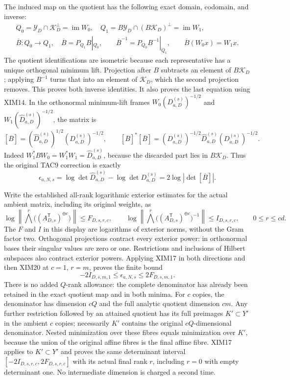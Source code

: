 The induced map on the quotient has the following exact domain,
codomain, and inverse:
\[
\begin{gathered}
 Q_0=\mathscr Y_D\cap\mathscr K_D^\perp=\operatorname{im}W_0,
 \quad Q_1=B\mathscr Y_D\cap(B\mathscr K_D)^\perp
                         =\operatorname{im}W_1,\\
 \overline B:Q_0\longrightarrow Q_1,
       \quad \overline B=P_{Q_1}B|_{Q_0},\qquad
 \overline B^{-1}=P_{Q_0}B^{-1}|_{Q_1},\qquad
 \overline B(W_0x)=W_1x.
\end{gathered}\tag{XIM17}
\]
The quotient identifications are isometric because each representative
has a unique orthogonal minimum lift. Projection after $B$ subtracts
an element of $B\mathscr K_D$; applying $B^{-1}$ turns that into an
element of $\mathscr K_D$, which the second projection removes.
This proves both inverse identities. It also proves the last equation
using XIM14. In the orthonormal minimum-lift frames
$W_0(D_{a,D}^{(s)})^{-1/2}$ and
$W_1(\widehat D_{a,D}^{(s)})^{-1/2}$, the matrix is
\[
 [\overline B]=
 (\widehat D_{a,D}^{(s)})^{1/2}(D_{a,D}^{(s)})^{-1/2},\qquad
 [\overline B]^*[\overline B]=
 (D_{a,D}^{(s)})^{-1/2}\widehat D_{a,D}^{(s)}(D_{a,D}^{(s)})^{-1/2}.
 \tag{XIM18}
\]
Indeed $W_1^*BW_0=W_1^*W_1=\widehat D_{a,D}^{(s)}$, because
the discarded part lies in $B\mathscr K_D$. Thus the original TAC9
correction is exactly
\[
 \epsilon_{a,N,s}
 =\log\det\widehat D_{a,D}^{(s)}-\log\det D_{a,D}^{(s)}
 =2\log|\det[\overline B]|.
 \tag{XIM19}
\]

Write the established all-rank logarithmic exterior estimates for the
actual ambient matrix, including its original weights, as
\[
 \log\left\|\bigwedge^r\bigl((A_{D,s}^{\mathsf T})^{\oplus c}\bigr)\right\|
       \le F_{D,s,r,c},\qquad
 \log\left\|\bigwedge^r\big((A_{D,s}^{\mathsf T})^{\oplus c}\big)^{-1}
       \right\|\le I_{D,s,r,c},\qquad 0\le r\le cd.
 \tag{XIM20}
\]
The $F$ and $I$ in this display are logarithms of exterior norms,
without the Gram factor two. Orthogonal projections contract every
exterior power: in orthonormal bases their singular values are zero
or one. Restrictions and inclusions of Hilbert subspaces also
contract exterior powers. Applying XIM17 in both directions and
then XIM20 at $c=1$, $r=m$, proves the finite bound
\[
 \boxed{-2I_{D,s,m,1}\le\epsilon_{a,N,s}\le2F_{D,s,m,1}.}
 \tag{XIM21}
\]
There is no added $Q$-rank allowance: the complete denominator has
already been retained in the exact quotient map and in both minima.
For $c$ copies, the denominator has dimension $cQ$ and the full
analytic quotient dimension $cm$. Any further restriction followed
by an attained quotient has its full preimages $K'\subset Y'$ in
the ambient $c$ copies; necessarily $K'$ contains the original
$cQ$-dimensional denominator. Nested minimization over these fibres
equals minimization over $K'$, because the union of the original
affine fibres is the final affine fibre. XIM17 applies to $K'\subset Y'$
and proves the same determinant interval $[-2I_{D,s,r,c},2F_{D,s,r,c}]$
with its actual final rank $r$, including $r=0$ with empty determinant
one. No intermediate dimension is charged a second time.

